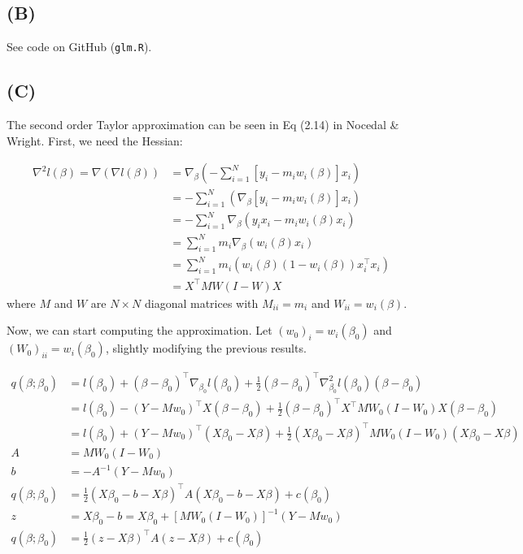 \documentclass{article}
\begin{document}
\subsection{(B)}
See code on GitHub (\texttt{glm.R}).

\subsection{(C)}
The second order Taylor approximation can be seen in Eq (2.14) in Nocedal \& Wright. First, we need the Hessian:

\begin{align*}
\nabla^2 l(\beta)=\nabla (\nabla l(\beta))&=\nabla_\beta\left(-\sum_{i=1}^N \left[y_i- m_iw_i(\beta)\right]x_i\right)\\
&=-\sum_{i=1}^N\left(\nabla_\beta\left[y_i- m_iw_i(\beta)\right]x_i\right)\\
&=-\sum_{i=1}^N\nabla_\beta\left(y_ix_i- m_iw_i(\beta)x_i\right)\\
&=\sum_{i=1}^Nm_i\nabla_\beta\left(w_i(\beta)x_i\right)\\
&=\sum_{i=1}^Nm_i\left(w_i(\beta)(1-w_i(\beta))x_i^\top x_i\right)\\
&=X^\top M W (I-W) X
\end{align*}
where $M$ and $W$ are $N\times N$ diagonal matrices with $M_{ii}=m_i$ and $W_{ii}=w_i(\beta)$.

Now, we can start computing the approximation. Let $\left(w_0\right)_i = w_i(\beta_0)$ and $\left(W_0\right)_{ii}=w_i(\beta_0)$, slightly modifying the previous results.

\begin{align*}
q(\beta; \beta_0)&= l(\beta_0) + (\beta-\beta_0)^\top \nabla_{\beta_0} l(\beta_0) + \frac{1}{2}(\beta-\beta_0)^\top \nabla_{\beta_0}^2 l(\beta_0) (\beta-\beta_0)\\
&=l(\beta_0) -  (Y - Mw_0)^\top X(\beta-\beta_0)+ \frac{1}{2}(\beta-\beta_0)^\top X^\top M W_0 (I-W_0) X (\beta-\beta_0)\\
&=l(\beta_0) +  (Y - Mw_0)^\top (X\beta_0-X\beta)+ \frac{1}{2}(X\beta_0-X\beta)^\top  M W_0 (I-W_0) (X\beta_0-X\beta)\\
A&=M W_0 (I-W_0)\\
b&=-A^{-1}(Y - Mw_0)\\
q(\beta; \beta_0)&=\frac{1}{2}(X\beta_0-b-X\beta)^\top A (X\beta_0-b-X\beta) + c(\beta_0)\\
z&=X\beta_0-b=X\beta_0+\left[M W_0 (I-W_0)\right]^{-1}(Y - Mw_0)\\
q(\beta; \beta_0)&=\frac{1}{2}(z-X\beta)^\top A (z-X\beta) + c(\beta_0)\\
\end{align*}
\end{document}
